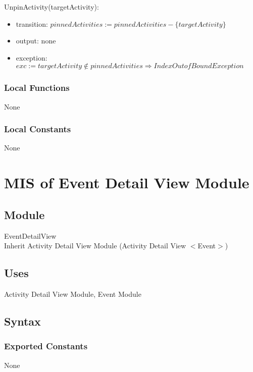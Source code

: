\documentclass[12pt, titlepage]{article}
\begin{document}
\noindent UnpinActivity(targetActivity):
\begin{itemize}
\item transition: $pinnedActivities := pinnedActivities - \{targetActivity\}$
\item output: none
\item exception: $exc := targetActivity \notin pinnedActivities \Rightarrow IndexOutofBound Exception$
\end{itemize}

\subsubsection{Local Functions}

None

\subsubsection{Local Constants}

None

\newpage

\section{MIS of Event Detail View Module} \label{mEDV}

\subsection{Module}

EventDetailView\\
Inherit Activity Detail View Module (Activity Detail View $<$Event$>$)
\subsection{Uses}

Activity Detail View Module, Event Module

\subsection{Syntax}

\subsubsection{Exported Constants}

None
\end{document}
